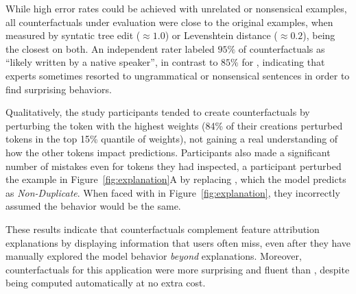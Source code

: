 While high error rates could be achieved with unrelated or nonsensical examples, all counterfactuals under evaluation were close to the original examples, when measured by syntatic tree edit (${\approx}1.0$) or Levenshtein distance (${\approx}0.2$), \cshap being the closest on both. An independent rater labeled $95\%$ of \cshap counterfactuals as ``likely written by a native speaker'', in contrast to $85\%$ for \chuman, indicating that experts sometimes resorted to ungrammatical or nonsensical sentences in order to find surprising behaviors.

Qualitatively, the study participants tended to create counterfactuals by perturbing the token with the highest weights (84\% of their creations perturbed tokens in the top 15\% quantile of weights), not gaining a real understanding of how the other tokens impact predictions. Participants also made a significant number of mistakes even for tokens they had inspected, \eg a participant perturbed the example in Figure~\ref{fig:explanation}A by replacing , which the model predicts as \emph{Non-Duplicate}. When faced with  in Figure~\ref{fig:explanation}, they incorrectly assumed the behavior would be the same.

These results indicate that \sysname{} counterfactuals complement feature attribution explanations by displaying information that users often miss, even after they have manually explored the model behavior \emph{beyond} explanations. Moreover, \sysname{} counterfactuals for this application were more surprising and fluent than \chuman, despite being computed automatically at no extra cost.



